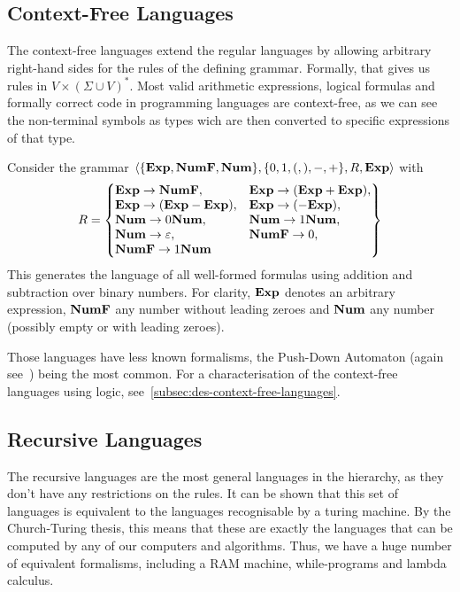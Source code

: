 \subsection{Context-Free Languages}\label{subsec:context-free-languages}

The context-free languages extend the regular languages by allowing arbitrary right-hand sides for the rules of the defining grammar.
Formally, that gives us rules in $V\times(\Sigma \cup V)^{*}$.
Most valid arithmetic expressions, logical formulas and formally correct code in programming languages are context-free, as we can see the non-terminal symbols as types wich are then converted to specific expressions of that type.

\begin{exmp}
    Consider the grammar $\langle \{\bold{Exp}, \bold{NumF}, \bold{Num}\}, \{0, 1, (, ), -, +\}, R, \bold{Exp} \rangle$ with
    \[
        R = \begin{Bmatrix*}[l]
                \bold{Exp} \to \bold{NumF},
                &\bold{Exp} \to (\bold{Exp} + \bold{Exp}), \\
                \bold{Exp} \to (\bold{Exp} - \bold{Exp}),
                &\bold{Exp} \to (-\bold{Exp}), \\
                \bold{Num} \to 0\bold{Num},
                &\bold{Num} \to 1\bold{Num}, \\
                \bold{Num} \to \varepsilon,
                &\bold{NumF} \to 0, \\
                \bold{NumF} \to 1\bold{Num}
        \end{Bmatrix*}
    \]
    This generates the language of all well-formed formulas using addition and subtraction over binary numbers.
    For clarity, $\bold{Exp}$ denotes an arbitrary expression, $\bold{NumF}$ any number without leading zeroes and $\bold{Num}$ any number (possibly empty or with leading zeroes).
\end{exmp}

Those languages have less known formalisms, the Push-Down Automaton (again see~\cite{theory-cs}) being the most common.
For a characterisation of the context-free languages using logic, see~\cref{subsec:des-context-free-languages}.

\subsection{Recursive Languages}\label{subsec:recursive-languages}

The recursive languages are the most general languages in the hierarchy, as they don't have any restrictions on the rules.
It can be shown that this set of languages is equivalent to the languages recognisable by a turing machine.
By the Church-Turing thesis, this means that these are exactly the languages that can be computed by any of our computers and algorithms.
Thus, we have a huge number of equivalent formalisms, including a RAM machine, while-programs and lambda calculus.

